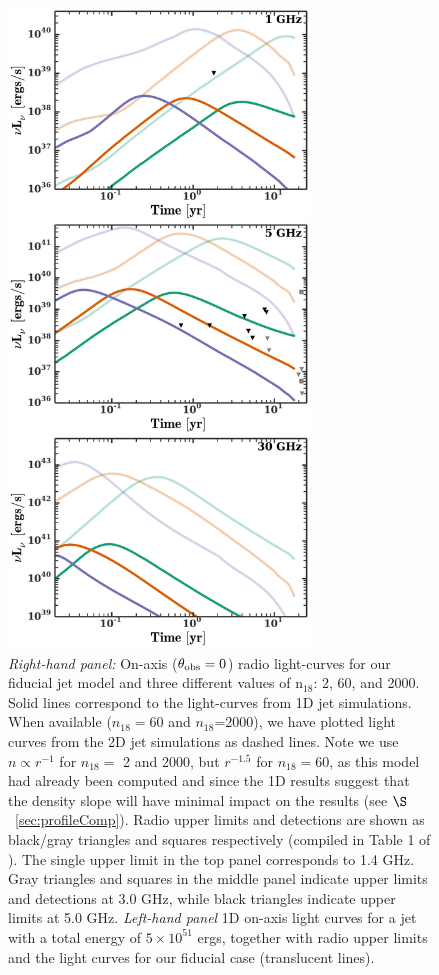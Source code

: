 \documentclass[usenatbib,fleqn]{mnras}
\begin{document}
\begin{figure}
  \includegraphics[width=8cm]{lightcurves_en.pdf}
  \caption{\label{fig:lightcurves} \textit{Right-hand panel:} On-axis
    ($\theta_{\rm obs}=0$) radio light-curves for our fiducial jet
    model and three different values of n$_{18}$: 2, 60, and
    2000. Solid lines correspond to the light-curves from 1D jet
    simulations. When available ($n_{18}=60$ and $n_{18}$=2000), we
    have plotted light curves from the 2D jet simulations as dashed
    lines. Note we use $n\propto r^{-1}$ for $n_{18}=$ 2 and 2000, but
    $r^{-1.5}$ for $n_{18}=60$, as this model had already been
    computed and since the 1D results suggest that the density slope
    will have minimal impact on the results (see
    $\S$~\ref{sec:profileComp}).  Radio upper limits and detections
    are shown as black/gray triangles and squares respectively
    (compiled in Table 1 of \citealt{Mimica+2015}). The single upper
    limit in the top panel corresponds to 1.4 GHz. Gray triangles and
    squares in the middle panel indicate upper limits and detections
    at 3.0 GHz, while black triangles indicate upper limits at 5.0
    GHz. \textit{Left-hand panel} 1D on-axis light curves for a jet
    with a total energy of $5\times 10^{51}$ ergs, together with radio
    upper limits and the light curves for our fiducial case
    (translucent lines).}
\end{figure}
\end{document}
